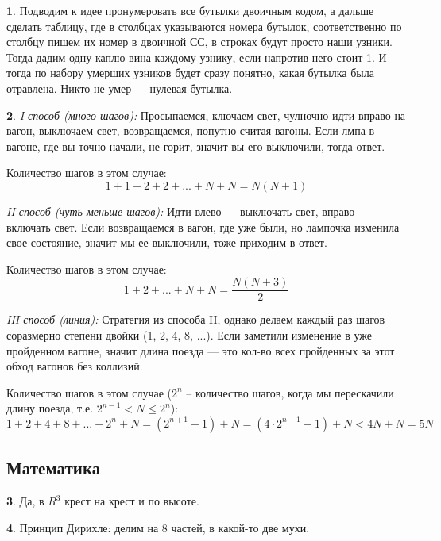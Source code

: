 \documentclass[14pt, a4paper]{extarticle}
\theoremstyle{definition}
\newtheorem{problem}{}
\theoremstyle{definition}
\theoremstyle{remark}
\numberwithin{equation}{section}
\begin{document}
\begin{problem}
    Подводим к идее пронумеровать все бутылки двоичным кодом, а дальше
    сделать таблицу, где в столбцах указываются номера бутылок, 
    соответственно по столбцу пишем их номер в двоичной СС, в строках
    будут просто наши узники. Тогда дадим одну каплю вина каждому 
    узнику, если напротив него стоит 1. И тогда по набору умерших узников
    будет сразу понятно, какая бутылка была отравлена. Никто не умер ---
    нулевая бутылка.
\end{problem}

\begin{problem}
    \textit{I способ (много шагов):} Просыпаемся, ключаем свет,
    чулночно идти вправо на вагон, выключаем свет, возвращаемся, попутно
    считая вагоны. Если лмпа в вагоне, где вы точно начали, не горит,
    значит вы его выключили, тогда ответ.

    Количество шагов в этом случае: 
    \[1 + 1 + 2 + 2 + ... + N + N = N(N + 1)\]

    \textit{II способ (чуть меньше шагов):} Идти влево --- выключать свет, вправо
    --- включать свет. Если возвращаемся в вагон, где уже были, но лампочка
    изменила свое состояние, значит мы ее выключили, тоже приходим в ответ.

    Количество шагов в этом случае: 
    \[1 + 2 + ... + N + N = \frac{N(N + 3)}{2}\] 

    \textit{III способ (линия):} Стратегия из способа II, однако
    делаем каждый раз шагов соразмерно степени двойки (1, 2, 4, 8, ...).
    Если заметили изменение в уже пройденном вагоне, значит длина поезда
    --- это кол-во всех пройденных за этот обход вагонов без коллизий.

    Количество шагов в этом случае ($2^n$ -- количество шагов, когда мы 
    перескачили длину поезда, т.е. $2^{n - 1} < N \leqslant 2^n$): 
    \[1 + 2 + 4 + 8 + ... + 2^n + N = (2^{n + 1} - 1) + N =
    (4 \cdot 2^{n - 1} - 1) + N < 4N + N = 5N\]
\end{problem}

\subsection*{Математика}
\setcounter{problem}{0}

\begin{problem}
    Да, в $R^3$ крест на крест и по высоте.
\end{problem}

\begin{problem}
    Принцип Дирихле: делим на 8 частей, в какой-то две мухи.
\end{problem}
\end{document}
